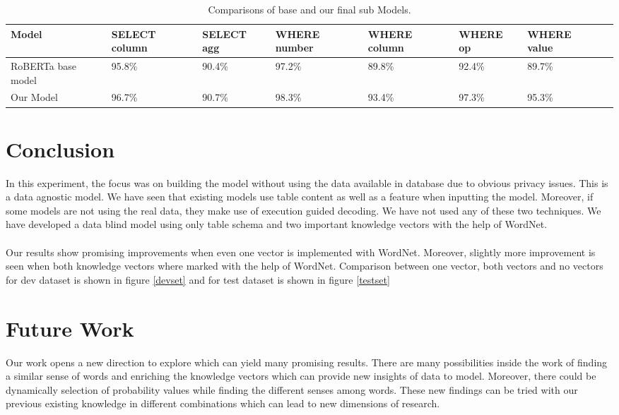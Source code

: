 \documentclass[12pt]{article}
\begin{document}
\begin{table}
\centering
 \begin{tabular}{| m{2cm} | m{2cm}| m{2cm} |m{2cm}| m{2cm} |m{2cm} | m{2cm} |m{2cm} |} 
 \hline
  Model & SELECT column & SELECT agg & WHERE number & WHERE column & WHERE op & WHERE value\\ 
 \hline\hline
  RoBERTa base model & 95.8\% & 90.4\% & 97.2\% & 89.8\% & 92.4\% &  89.7\% \\ 
\hline
 Our Model &  96.7\% & 90.7\% & 98.3\% & 93.4\% & 97.3\% &  95.3\% \\ 
 \hline
\end{tabular}
\caption{Comparisons of base and our final sub Models.}
\label{finalcomparison}
\end{table}


\section{Conclusion}
In this experiment, the focus was on building the model without using the data available in database due to obvious privacy issues. This is a data agnostic model. We have seen that existing models use table content as well as a feature when inputting the model. Moreover, if some models are not using the real data, they make use of execution guided decoding. We have not used any of these two techniques. We have developed a data blind model using only table schema and two important knowledge vectors with the help of WordNet. 
\\
\\
Our results show promising improvements when even one vector is implemented with WordNet. Moreover, slightly more improvement is seen when both knowledge vectors where marked with the help of WordNet. Comparison between one vector, both vectors and no vectors for dev dataset is shown in figure \ref{devset} and for test dataset is shown in figure \ref{testset}


\section{Future Work}
Our work opens a new direction to explore which can yield many promising results. There are many possibilities inside the work of finding a similar sense of words and enriching the knowledge vectors which can provide new insights of data to model. Moreover, there could be dynamically selection of probability values while finding the different senses among words. These new findings can be tried with our previous existing knowledge in different combinations which can lead to new dimensions of research. 
\end{document}
